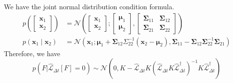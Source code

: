 \documentclass{article}
\begin{document}
We have the joint normal distribution condition formula.
$$
\begin{aligned}
p\left(\left[\begin{array}{l}
\mathbf{x}_{1} \\
\mathbf{x}_{2}
\end{array}\right]\right) &=\mathcal{N}\left(\left[\begin{array}{l}
\mathbf{x}_{1} \\
\mathbf{x}_{2}
\end{array}\right] ;\left[\begin{array}{l}
\boldsymbol{\mu}_{1} \\
\boldsymbol{\mu}_{2}
\end{array}\right],\left[\begin{array}{ll}
\boldsymbol{\Sigma}_{11} & \boldsymbol{\Sigma}_{12} \\
\boldsymbol{\Sigma}_{21} & \boldsymbol{\Sigma}_{22}
\end{array}\right]\right) \\
p\left(\mathbf{x}_{1} \mid \mathbf{x}_{2}\right) &=\mathcal{N}\left(\mathbf{x}_{1} ; \boldsymbol{\mu}_{1}+\boldsymbol{\Sigma}_{12} \Sigma_{22}^{-1}\left(\mathbf{x}_{2}-\boldsymbol{\mu}_{2}\right), \boldsymbol{\Sigma}_{11}-\boldsymbol{\Sigma}_{12} \boldsymbol{\Sigma}_{22}^{-1} \boldsymbol{\Sigma}_{21}\right)
\end{aligned}
$$
Therefore, we have 
$$
p(F|\hat{\mathcal{L}}_{\Delta t}[F]=0)\sim \mathcal{N}\left(0,K-\hat{\mathcal{L}}_{\Delta t}K(\hat{\mathcal{L}}_{\Delta t} K \hat{\mathcal{L}}^\dagger_{\Delta t} )^{-1}K\hat{\mathcal{L}}^\dagger_{\Delta t} \right)
$$
\end{document}
